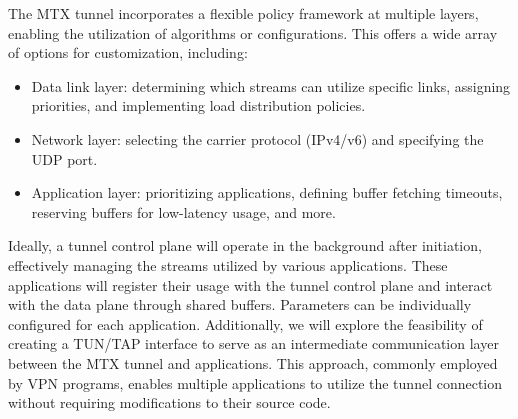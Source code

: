 The MTX tunnel incorporates a flexible policy framework at multiple layers, enabling the utilization of algorithms or configurations. 
This offers a wide array of options for customization, including:
\begin{itemize}
	\item Data link layer: determining which streams can utilize specific links, assigning priorities, and implementing load distribution policies.
	\item Network layer: selecting the carrier protocol (IPv4/v6) and specifying the UDP port.
	\item Application layer: prioritizing applications, defining buffer fetching timeouts, reserving buffers for low-latency usage, and more.
\end{itemize}

Ideally, a tunnel control plane will operate in the background after initiation, effectively managing the streams utilized by various applications. 
These applications will register their usage with the tunnel control plane and interact with the data plane through shared buffers. 
Parameters can be individually configured for each application.
Additionally, we will explore the feasibility of creating a TUN/TAP interface to serve as an intermediate communication layer between the MTX tunnel and applications. 
This approach, commonly employed by VPN programs, enables multiple applications to utilize the tunnel connection without requiring modifications to their source code.

